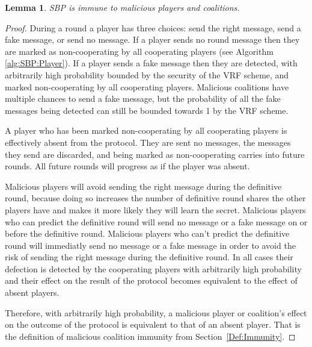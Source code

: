 \documentclass{dalcsthesis}
\newtheorem{lemma}{Lemma}
\begin{document}
\begin{lemma}\label{Lem:SBPMalImmune}SBP is immune to malicious players and coalitions.\end{lemma}
\begin{proof}
During a round a player has three choices: send the right message, send a fake message, or send no message. If a player sends no round message then they are marked as non-cooperating by all cooperating players (see Algorithm \ref{alg:SBP:Player}). If a player sends a fake message then they are detected, with arbitrarily high probability bounded by the security of the VRF scheme, and marked non-cooperating by all cooperating players. Malicious coalitions have multiple chances to send a fake message, but the probability of all the fake messages being detected can still be bounded towards 1 by the VRF scheme. 

A player who has been marked non-cooperating by all cooperating players is effectively absent from the protocol. They are sent no messages, the messages they send are discarded, and being marked as non-cooperating carries into future rounds. All future rounds will progress as if the player was absent.

Malicious players will avoid sending the right message during the definitive round, because doing so increases the number of definitive round shares the other players have and makes it more likely they will learn the secret. Malicious players who can predict the definitive round will send no message or a fake message on or before the definitive round. Malicious players who can't predict the definitive round will immediatly send no message or a fake message in order to avoid the risk of sending the right message during the definitive round. In all cases their defection is detected by the cooperating players with arbitrarily high probability and their effect on the result of the protocol becomes equivalent to the effect of absent players.

Therefore, with arbitrarily high probability, a malicious player or coalition's effect on the outcome of the protocol is equivalent to that of an absent player. That is the definition of malicious coalition immunity from Section~\ref{Def:Immunity}.
\end{proof}
\end{document}
